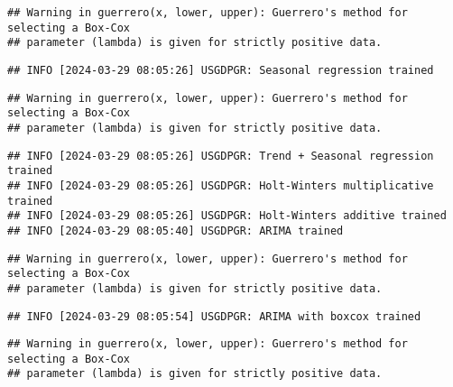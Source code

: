 \documentclass[
]{article}
\begin{document}
\begin{verbatim}
## Warning in guerrero(x, lower, upper): Guerrero's method for selecting a Box-Cox
## parameter (lambda) is given for strictly positive data.
\end{verbatim}

\begin{verbatim}
## INFO [2024-03-29 08:05:26] USGDPGR: Seasonal regression trained
\end{verbatim}

\begin{verbatim}
## Warning in guerrero(x, lower, upper): Guerrero's method for selecting a Box-Cox
## parameter (lambda) is given for strictly positive data.
\end{verbatim}

\begin{verbatim}
## INFO [2024-03-29 08:05:26] USGDPGR: Trend + Seasonal regression trained
## INFO [2024-03-29 08:05:26] USGDPGR: Holt-Winters multiplicative trained
## INFO [2024-03-29 08:05:26] USGDPGR: Holt-Winters additive trained
## INFO [2024-03-29 08:05:40] USGDPGR: ARIMA trained
\end{verbatim}

\begin{verbatim}
## Warning in guerrero(x, lower, upper): Guerrero's method for selecting a Box-Cox
## parameter (lambda) is given for strictly positive data.
\end{verbatim}

\begin{verbatim}
## INFO [2024-03-29 08:05:54] USGDPGR: ARIMA with boxcox trained
\end{verbatim}

\begin{verbatim}
## Warning in guerrero(x, lower, upper): Guerrero's method for selecting a Box-Cox
## parameter (lambda) is given for strictly positive data.
\end{verbatim}
\end{document}
